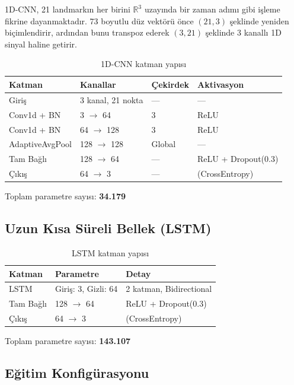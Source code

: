 \documentclass[12pt,a4paper]{article}
\begin{document}
1D-CNN, 21 landmarkın her birini $\mathbb{R}^3$ uzayında bir zaman adımı gibi işleme fikrine dayanmaktadır. 73 boyutlu düz vektörü önce $(21, 3)$ şeklinde yeniden biçimlendirir, ardından bunu transpoz ederek $(3, 21)$ şeklinde 3 kanallı 1D sinyal haline getirir.

\begin{table}[H]
\centering
\caption{1D-CNN katman yapısı}
\begin{tabular}{@{}llll@{}}
\toprule
\textbf{Katman} & \textbf{Kanallar} & \textbf{Çekirdek} & \textbf{Aktivasyon} \\
\midrule
Giriş & 3 kanal, 21 nokta & --- & --- \\
Conv1d + BN & 3 $\rightarrow$ 64 & 3 & ReLU \\
Conv1d + BN & 64 $\rightarrow$ 128 & 3 & ReLU \\
AdaptiveAvgPool & 128 $\rightarrow$ 128 & Global & --- \\
Tam Bağlı & 128 $\rightarrow$ 64 & --- & ReLU + Dropout(0.3) \\
Çıkış & 64 $\rightarrow$ 3 & --- & (CrossEntropy) \\
\bottomrule
\end{tabular}
\end{table}

Toplam parametre sayısı: \textbf{34.179}

\subsection{Uzun Kısa Süreli Bellek (LSTM)}

\begin{table}[H]
\centering
\caption{LSTM katman yapısı}
\begin{tabular}{@{}lll@{}}
\toprule
\textbf{Katman} & \textbf{Parametre} & \textbf{Detay} \\
\midrule
LSTM & Giriş: 3, Gizli: 64 & 2 katman, Bidirectional \\
Tam Bağlı & 128 $\rightarrow$ 64 & ReLU + Dropout(0.3) \\
Çıkış & 64 $\rightarrow$ 3 & (CrossEntropy) \\
\bottomrule
\end{tabular}
\end{table}

Toplam parametre sayısı: \textbf{143.107}

\subsection{Eğitim Konfigürasyonu}
\end{document}
